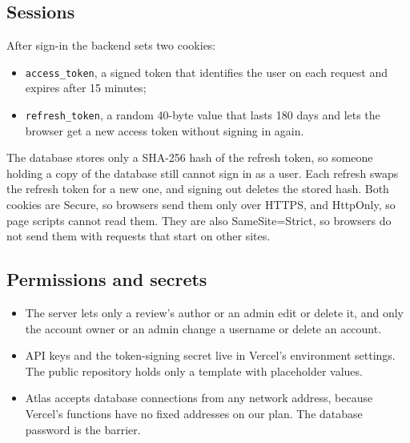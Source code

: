\documentclass[11pt,a4paper]{article}
\begin{document}
\subsection{Sessions}
\label{sec:sessions}

After sign-in the backend sets two cookies:
\begin{itemize}
  \item \texttt{access\_token}, a signed token that identifies the user on
    each request and expires after 15 minutes;
  \item \texttt{refresh\_token}, a random 40-byte value that lasts 180 days
    and lets the browser get a new access token without signing in again.
\end{itemize}
The database stores only a SHA-256 hash of the refresh token, so someone
holding a copy of the database still cannot sign in as a user.  Each refresh
swaps the refresh token for a new one, and signing out deletes the stored
hash.  Both cookies are Secure, so browsers send them only over HTTPS, and
HttpOnly, so page scripts cannot read them.  They are also SameSite=Strict, so
browsers do not send them with requests that start on other sites.

\subsection{Permissions and secrets}

\begin{itemize}
  \item The server lets only a review's author or an admin edit or delete
    it, and only the account owner or an admin change a username or delete
    an account.
  \item API keys and the token-signing secret live in Vercel's environment
    settings.  The public repository holds only a template with placeholder
    values.
  \item Atlas accepts database connections from any network address,
    because Vercel's functions have no fixed addresses on our plan.  The
    database password is the barrier.
\end{itemize}

\end{document}
